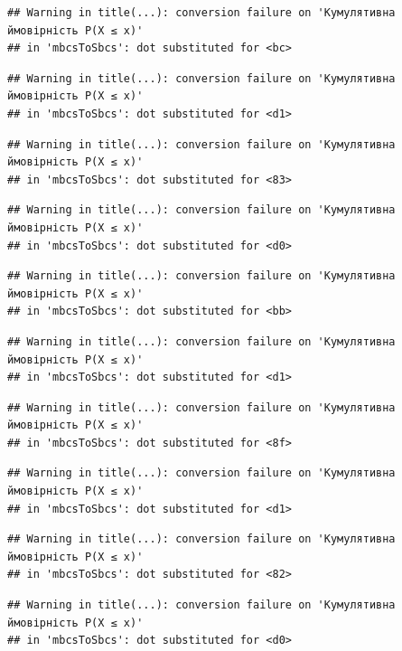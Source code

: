 \documentclass[
  11pt,
]{book}
\begin{document}
\begin{verbatim}
## Warning in title(...): conversion failure on 'Кумулятивна ймовірність P(X ≤ x)'
## in 'mbcsToSbcs': dot substituted for <bc>
\end{verbatim}

\begin{verbatim}
## Warning in title(...): conversion failure on 'Кумулятивна ймовірність P(X ≤ x)'
## in 'mbcsToSbcs': dot substituted for <d1>
\end{verbatim}

\begin{verbatim}
## Warning in title(...): conversion failure on 'Кумулятивна ймовірність P(X ≤ x)'
## in 'mbcsToSbcs': dot substituted for <83>
\end{verbatim}

\begin{verbatim}
## Warning in title(...): conversion failure on 'Кумулятивна ймовірність P(X ≤ x)'
## in 'mbcsToSbcs': dot substituted for <d0>
\end{verbatim}

\begin{verbatim}
## Warning in title(...): conversion failure on 'Кумулятивна ймовірність P(X ≤ x)'
## in 'mbcsToSbcs': dot substituted for <bb>
\end{verbatim}

\begin{verbatim}
## Warning in title(...): conversion failure on 'Кумулятивна ймовірність P(X ≤ x)'
## in 'mbcsToSbcs': dot substituted for <d1>
\end{verbatim}

\begin{verbatim}
## Warning in title(...): conversion failure on 'Кумулятивна ймовірність P(X ≤ x)'
## in 'mbcsToSbcs': dot substituted for <8f>
\end{verbatim}

\begin{verbatim}
## Warning in title(...): conversion failure on 'Кумулятивна ймовірність P(X ≤ x)'
## in 'mbcsToSbcs': dot substituted for <d1>
\end{verbatim}

\begin{verbatim}
## Warning in title(...): conversion failure on 'Кумулятивна ймовірність P(X ≤ x)'
## in 'mbcsToSbcs': dot substituted for <82>
\end{verbatim}

\begin{verbatim}
## Warning in title(...): conversion failure on 'Кумулятивна ймовірність P(X ≤ x)'
## in 'mbcsToSbcs': dot substituted for <d0>
\end{verbatim}
\end{document}
